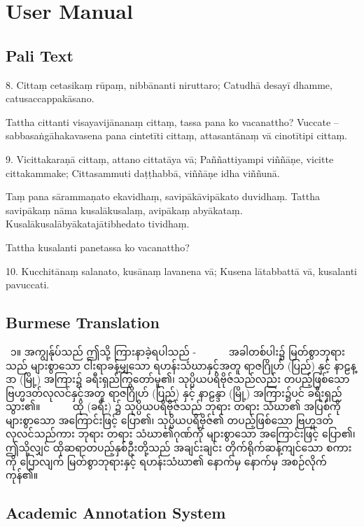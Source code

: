 \chapter{User Manual}

\starthere

\section{Pali Text}
8.
Cittaṃ cetasikaṃ rūpaṃ, nibbānanti niruttaro;
Catudhā desayī dhamme, catusaccappakāsano.

Tattha cittanti visayavijānanaṃ cittaṃ, tassa pana ko vacanattho? Vuccate – sabbasaṅgāhakavasena pana cintetīti cittaṃ, attasantānaṃ vā cinotītipi cittaṃ.

9.
Vicittakaraṇā cittaṃ, attano cittatāya vā;
Paññattiyampi viññāṇe, vicitte cittakammake;
Cittasammuti daṭṭhabbā, viññāṇe idha viññunā.

Taṃ pana sārammaṇato ekavidhaṃ, savipākāvipākato duvidhaṃ. Tattha savipākaṃ nāma kusalākusalaṃ, avipākaṃ abyākataṃ. Kusalākusalābyākatajātibhedato tividhaṃ.

Tattha kusalanti panetassa ko vacanattho?

10.
Kucchitānaṃ salanato, kusānaṃ lavanena vā;
Kusena lātabbattā vā, kusalanti pavuccati.

\section{Burmese Translation}
 ၁။ အကျွန်ုပ်သည် ဤသို့ ကြားနာခဲ့ရပါသည် -
       အခါတစ်ပါး၌ မြတ်စွာဘုရားသည် များစွာသော ငါးရာခန့်မျှသော ရဟန်းသံဃာနှင့်အတူ ရာဇဂြိုဟ် (ပြည်) နှင့် နာဠန္ဒာ (မြို့) အကြား၌ ခရီးရှည်ကြွတော်မူ၏၊ သုပ္ပိယပရိဗိုဇ်သည်လည်း တပည့်ဖြစ်သော ဗြဟ္မဒတ်လုလင်နှင့်အတူ ရာဇဂြိုဟ် (ပြည်) နှင့် နာဠန္ဒာ (မြို့) အကြား၌ပင် ခရီးရှည်သွား၏။
       ထို (ခရီး) ၌ သုပ္ပိယပရိဗိုဇ်သည် ဘုရား တရား သံဃာ၏ အပြစ်ကို များစွာသော အကြောင်းဖြင့် ပြော၏၊ သုပ္ပိယပရိဗိုဇ်၏ တပည့်ဖြစ်သော ဗြဟ္မဒတ်လုလင်သည်ကား ဘုရား တရား သံဃာ၏ဂုဏ်ကို များစွာသော အကြောင်းဖြင့် ပြော၏၊ ဤသို့လျှင် ထိုဆရာတပည့်နှစ်ဦးတို့သည် အချင်းချင်း တိုက်ရိုက်ဆန့်ကျင်သော စကားကို ပြောလျက် မြတ်စွာဘုရားနှင့် ရဟန်းသံဃာ၏ နောက်မှ နောက်မှ အစဉ်လိုက်ကုန်၏။

\section{Academic Annotation System}


